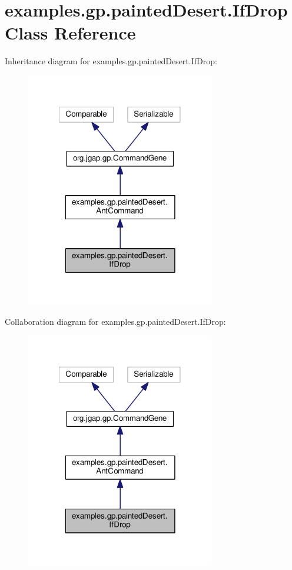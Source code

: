 \hypertarget{classexamples_1_1gp_1_1painted_desert_1_1_if_drop}{\section{examples.\-gp.\-painted\-Desert.\-If\-Drop Class Reference}
\label{classexamples_1_1gp_1_1painted_desert_1_1_if_drop}
}


Inheritance diagram for examples.\-gp.\-painted\-Desert.\-If\-Drop\-:
\nopagebreak
\begin{figure}[H]
\begin{center}
\leavevmode
\includegraphics[width=233pt]{classexamples_1_1gp_1_1painted_desert_1_1_if_drop__inherit__graph}
\end{center}
\end{figure}


Collaboration diagram for examples.\-gp.\-painted\-Desert.\-If\-Drop\-:
\nopagebreak
\begin{figure}[H]
\begin{center}
\leavevmode
\includegraphics[width=233pt]{classexamples_1_1gp_1_1painted_desert_1_1_if_drop__coll__graph}
\end{center}
\end{figure}
